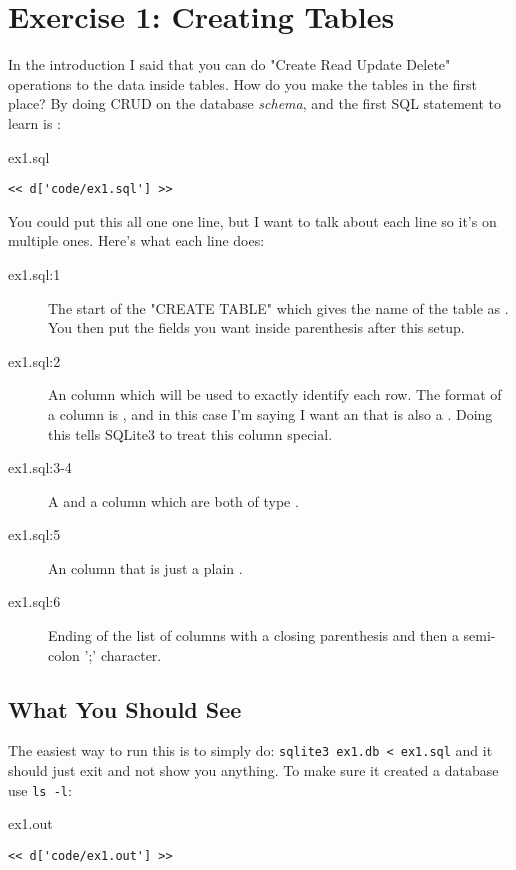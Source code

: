 \chapter{Exercise 1: Creating Tables}

In the introduction I said that you can do "Create Read Update Delete" operations to the data
inside tables.  How do you make the tables in the first place?  By doing CRUD on the database
\emph{schema}, and the first SQL statement to learn is :

\begin{code}{ex1.sql}
\begin{Verbatim}
<< d['code/ex1.sql'] >>
\end{Verbatim}
\end{code}

You could put this all one one line, but I want to talk about each line
so it's on multiple ones.  Here's what each line does:

\begin{description}
\item[ex1.sql:1] The start of the "CREATE TABLE" which gives the name of the
    table as . You then put the fields you want inside parenthesis
    after this setup.
\item[ex1.sql:2] An  column which will be used to exactly identify
    each row.  The format of a column is , and in this case
    I'm saying I want an  that is also a .
    Doing this tells SQLite3 to treat this column special.
\item[ex1.sql:3-4] A  and a  column 
    which are both of type .
\item[ex1.sql:5] An  column that is just a plain .
\item[ex1.sql:6] Ending of the list of columns with a closing parenthesis and
    then a semi-colon ';' character.
\end{description}


\section{What You Should See}

The easiest way to run this is to simply do: \verb|sqlite3 ex1.db < ex1.sql| and
it should just exit and not show you anything.  To make sure it created a
database use \verb|ls -l|:


\begin{code}{ex1.out}
\begin{Verbatim}
<< d['code/ex1.out'] >>
\end{Verbatim}
\end{code}


